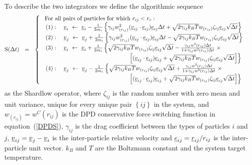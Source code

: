 To describe the two integrators we define the algorithmic sequence
\begin{equation}
{\rm S}(\Delta t)~~=~~\left\{ \begin{array} {l}
\textnormal{~For all pairs of particles for which}~r_{ij} < r_{c} : \\
\begin{array} {l}
(1):~~~\mbox{$\underline{v}$}_{i}~\leftarrow~\mbox{$\underline{v}$}_{i} - \frac{1}{2 m_{i}} \left\{ \gamma_{ij} w^{2}_{(r_{ij})}
(\mbox{$\underline{v}$}_{ij} \cdot \mbox{$\underline{e}$}_{ij}) \mbox{$\underline{e}$}_{ij} \Delta t +
\sqrt{2 \gamma_{ij} k_{B} T} w_{(r_{ij})} \zeta_{ij} \mbox{$\underline{e}$}_{ij} \sqrt{\Delta t} \right\} \\
(2):~~~\mbox{$\underline{v}$}_{j}~\leftarrow~\mbox{$\underline{v}$}_{j} + \frac{1}{2 m_{i}} \left\{ \gamma_{ij} w^{2}_{(r_{ij})}
(\mbox{$\underline{v}$}_{ij} \cdot \mbox{$\underline{e}$}_{ij}) \mbox{$\underline{e}$}_{ij} \Delta t -
\sqrt{2 \gamma_{ij} k_{B} T} w_{(r_{ij})} \zeta_{ij} \mbox{$\underline{e}$}_{ij} \sqrt{\Delta t} \right\} \\
(3):~~~\mbox{$\underline{v}$}_{i}~\leftarrow~\mbox{$\underline{v}$}_{i} + \frac{1}{2 m_{i}} \left\{ \sqrt{2 \gamma_{ij} k_{B} T}
w_{(r_{ij})} \zeta_{ij} \mbox{$\underline{e}$}_{ij} \sqrt{\Delta t} -
\frac{\gamma_{ij} w^{2}(r_{ij}) \Delta t}{1 + \gamma_{ij} w^{2}(r_{ij}) \Delta t} \right. \times \\
\phantom{xxxxxxxxxxxxxxxxxxxxxxxxx} \left. \left[(\mbox{$\underline{v}$}_{ij} \cdot \mbox{$\underline{e}$}_{ij}) \mbox{$\underline{e}$}_{ij} +
\sqrt{2 \gamma_{ij} k_{B} T} w_{(r_{ij})} \zeta_{ij} \mbox{$\underline{e}$}_{ij} \sqrt{\Delta t} \right] \right\} \\
(4):~~~\mbox{$\underline{v}$}_{j}~\leftarrow~\mbox{$\underline{v}$}_{j} - \frac{1}{2 m_{i}} \left\{ \sqrt{2 \gamma_{ij} k_{B} T}
w_{(r_{ij})} \zeta_{ij} \mbox{$\underline{e}$}_{ij} \sqrt{\Delta t} +
\frac{\gamma_{ij} w^{2}(r_{ij}) \Delta t}{1 + \gamma_{ij} w^{2}(r_{ij}) \Delta t}  \right. \times \\
\phantom{xxxxxxxxxxxxxxxxxxxxxxxxx} \left. \left[(\mbox{$\underline{v}$}_{ij} \cdot \mbox{$\underline{e}$}_{ij}) \mbox{$\underline{e}$}_{ij} +
\sqrt{2 \gamma_{ij} k_{B} T} w_{(r_{ij})} \zeta_{ij} \mbox{$\underline{e}$}_{ij} \sqrt{\Delta t} \right] \right\}
\end{array} \end{array} \right.
\end{equation}
as the Shardlow operator, where $\zeta_{ij}$ is the random number with zero mean
and unit variance, unique for every unique pair $\left\{ij\right\}$ in the system,
and $w_{(r_{ij})} = w^{C}(r_{ij})$ is the DPD conservative force switching function in
equation~(\ref{DPDS}), $\gamma_{ij}$ is the drag coefficient between the types of
particles $i$ and $j$, $\mbox{$\underline{v}$}_{ij} = \mbox{$\underline{v}$}_{j}-\mbox{$\underline{v}$}_{i}$ is the inter-particle
relative velocity and $\mbox{$\underline{e}$}_{ij} = \mbox{$\underline{r}$}_{ij}/r_{ij}$ is the inter-particle unit
vector.  $k_{B}$ and $T$ are the Boltzmann constant and the system target temperature.

